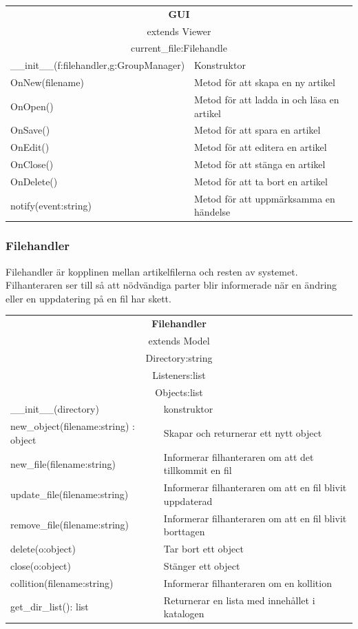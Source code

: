 \begin{tabular}{|l|p{10 cm}|}
\hline
\multicolumn{2}{|c|}{\textbf{GUI}} \\
\multicolumn{2}{|c|}{extends Viewer} \\
\hline
\multicolumn{2}{|c|}{current\_file:Filehandle} \\
\hline
\_\_init\_\_(f:filehandler,g:GroupManager) & Konstruktor\\
OnNew(filename) & Metod för att skapa en ny artikel\\
OnOpen() & Metod för att ladda in och läsa en artikel \\ 
OnSave() & Metod för att spara en artikel \\
OnEdit() & Metod för att editera en artikel \\
OnClose() & Metod för att stänga en artikel \\
OnDelete() & Metod för att ta bort en artikel\\
notify(event:string) & Metod för att uppmärksamma en händelse\\
\hline
\end{tabular}

\subsubsection{Filehandler}
Filehandler är kopplinen mellan artikelfilerna och resten av systemet. Filhanteraren ser till så att nödvändiga parter blir informerade när en ändring eller en uppdatering på en fil har skett. 

\begin{tabular}{|l|p{10 cm}|}
\hline
\multicolumn{2}{|c|}{\textbf{Filehandler}} \\
\multicolumn{2}{|c|}{extends Model} \\
\hline
\multicolumn{2}{|c|}{Directory:string} \\
\multicolumn{2}{|c|}{Listeners:list} \\
\multicolumn{2}{|c|}{Objects:list} \\
\hline
\_\_init\_\_(directory) &konstruktor\\
new\_object(filename:string) : object & Skapar och returnerar ett nytt object\\
new\_file(filename:string) & Informerar filhanteraren om att det tillkommit en fil\\
update\_file(filename:string) & Informerar filhanteraren om att en fil blivit uppdaterad\\
remove\_file(filename:string) & Informerar filhanteraren om att en fil blivit borttagen\\
delete(o:object) & Tar bort ett object\\
close(o:object) & Stänger ett object\\
collition(filename:string) & Informerar filhanteraren om en kollition\\
get\_dir\_list(): list & Returnerar en lista med innehållet i katalogen\\
\hline
\end{tabular}

